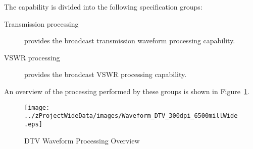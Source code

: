 The \ThisSys \ThisSegment \DTV capability is divided into the following specification groups:
\begin{description}
	\item[Transmission processing] provides the \DTV broadcast transmission waveform processing capability.%
	\item[VSWR processing] provides the \DTV broadcast VSWR processing capability.%
\end{description}
An overview of the processing performed by these groups is shown in Figure~\ref{fig:DTV_Waveform_Processing}.
\begin{figure}[htbp]
	\centering
		\texttt{[image: ../zProjectWideData/images/Waveform\_DTV\_300dpi\_6500millWide.eps]}
	\caption[DTV Waveform Processing Overview]{DTV Waveform Processing Overview}
	\label{fig:DTV_Waveform_Processing}
\end{figure}

%
%
%

